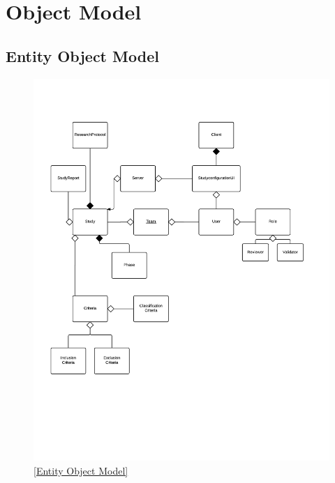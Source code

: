 \section{Object Model}
\subsection{Entity Object Model}
\begin{figure}[H]
  \includegraphics[width=45em]{section/EntityObjectModel/Entity_Object_Model}
  \label{fig:Entity Object Model}
  \ref{Entity Object Model}
\end{figure}